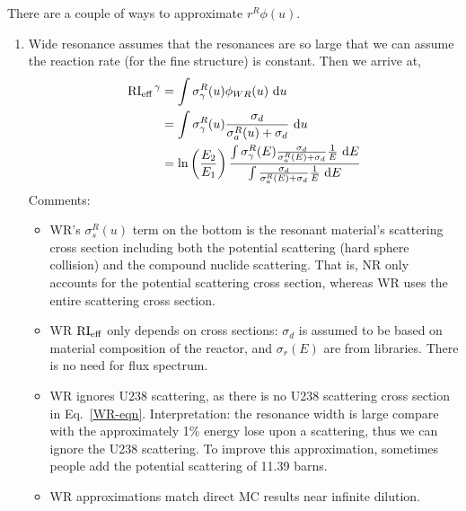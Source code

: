 \documentclass{school-22.211-notes}
\begin{document}
There are a couple of ways to approximate $r^R \phi(u)$. 
\begin{enumerate}
\item Wide resonance assumes that the resonances are so large that we can assume the reaction rate (for the fine structure) is constant. 
Then we arrive at, 
\begin{align}
\left. \mathrm{RI}_{\mathrm{eff}} \right.^{\gamma} &= \int \sigma_{\gamma}^R (u) \phi_{WR} (u) \mbox{ }\mathrm{d} u \\
&= \int \sigma_{\gamma}^R (u) \frac{\sigma_d}{\sigma_a^R(u) + \sigma_d} \mbox{ }\mathrm{d} u \\
&= \ln\left( \frac{E_2}{E_1} \right) \frac{ \int \sigma_{\gamma}^R (E) \frac{\sigma_d}{\sigma_{a}^R(E) + \sigma_d} \frac{1}{E} \mbox{ }\mathrm{d} E}{ \int \frac{\sigma_d}{\sigma_{a}^R(E) + \sigma_d} \frac{1}{E} \mbox{ }\mathrm{d} E}
\end{align}
Comments:
\begin{itemize}
\item WR's $\sigma_s^R (u)$ term on the bottom is the resonant material's scattering cross section including both the potential scattering (hard sphere collision) and the compound nuclide scattering. That is, NR only accounts for the potential scattering cross section, whereas WR uses the entire scattering cross section. 

\item WR $\mathrm{RI}_{\mathrm{eff}}$ only depends on cross sections: $\sigma_d$ is assumed to be based on material composition of the reactor, and $\sigma_r(E)$ are from libraries. There is no need for flux spectrum. 

\item WR ignores U238 scattering, as there is no U238 scattering cross section in Eq.~\ref{WR-eqn}. Interpretation: the resonance width is large compare with the approximately 1\% energy lose upon a scattering, thus we can ignore the U238 scattering. To improve this approximation, sometimes people add the potential scattering of 11.39 barns. 

\item WR approximations match direct MC results near infinite dilution. 
\end{itemize}


\end{enumerate}
\end{document}
